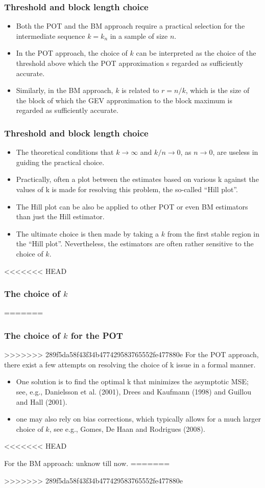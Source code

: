 \documentclass{beamer}
\begin{document}
\begin{frame}
    \frametitle{Threshold and block length choice}
\begin{itemize}
    \item Both the POT and the BM approach require a practical selection for the intermediate sequence $k=k_n$ in a sample of size $n$.
    \item In the POT approach, the choice of $k$ can be interpreted as
    the choice of the threshold above which the POT approximation s regarded as sufficiently
    accurate.
    \item Similarly, in the BM approach, $k$ is related to $r=n/k$, which is the size of the block
    of which the GEV approximation to the block maximum is regarded as sufficiently accurate.
\end{itemize}
    

\end{frame}


\begin{frame}
    \frametitle{Threshold and block length choice}

    \begin{itemize}
        \item The theoretical conditions that $k\to \infty$ and $k/n\to 0$, as $n \to 0$, are useless in guiding the practical choice. 
        \item Practically, often a plot between the estimates based on various k against the values
        of k is made for resolving this problem, the so-called “Hill plot”.
        \item The Hill plot can be also be applied to other POT or even BM estimators than
        just the Hill estimator.
        \item The ultimate choice is then made by taking a $k$ from the first stable
        region in the “Hill plot”. Nevertheless, the estimators are often rather sensitive to the choice of $k$.
    \end{itemize}

\end{frame}

\begin{frame}
<<<<<<< HEAD
    \frametitle{The choice of $k$}
=======
    \frametitle{The choice of $k$ for the POT}
>>>>>>> 289f5da58f43f34b477429583765552fe477880e
    For the POT approach, there exist a few attempts on resolving the choice of k issue in a formal manner.
\begin{itemize}
    \item One solution is to find the optimal k that minimizes the asymptotic MSE; see, e.g., Danielsson et al. (2001), Drees and Kaufmann (1998) and Guillou and Hall (2001).
    \item one may also rely on bias corrections, which typically allows
    for a much larger choice of $k$, see e.g., Gomes, De Haan and Rodrigues (2008).
\end{itemize}
<<<<<<< HEAD
\medskip

For the BM approach: unknow till now.
=======
    
>>>>>>> 289f5da58f43f34b477429583765552fe477880e

\end{frame}
\end{document}
